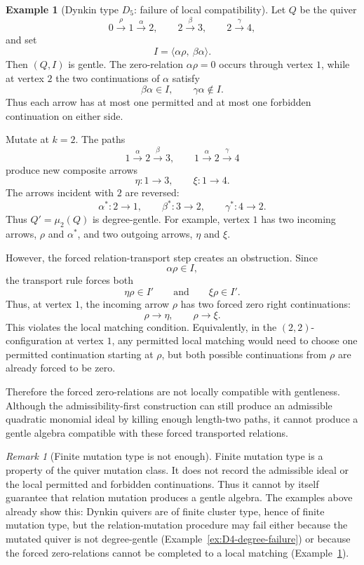 \documentclass[11pt]{article}
\theoremstyle{plain}
\theoremstyle{definition}
\newtheorem{example}[theorem]{Example}
\theoremstyle{remark}
\newtheorem{remark}[theorem]{Remark}
\begin{document}
\begin{example}[Dynkin type \(D_5\): failure of local compatibility]
\label{ex:D5-local-failure}
Let \(Q\) be the quiver
\[
  0\xrightarrow{\rho}1\xrightarrow{\alpha}2,
  \qquad
  2\xrightarrow{\beta}3,
  \qquad
  2\xrightarrow{\gamma}4,
\]
and set
\[
  I=\langle \alpha\rho,\ \beta\alpha\rangle.
\]
Then \((Q,I)\) is gentle.  The zero-relation \(\alpha\rho=0\) occurs through
vertex \(1\), while at vertex \(2\) the two continuations of \(\alpha\) satisfy
\[
  \beta\alpha\in I,
  \qquad
  \gamma\alpha\notin I.
\]
Thus each arrow has at most one permitted and at most one forbidden
continuation on either side.

Mutate at \(k=2\).  The paths
\[
  1\xrightarrow{\alpha}2\xrightarrow{\beta}3,
  \qquad
  1\xrightarrow{\alpha}2\xrightarrow{\gamma}4
\]
produce new composite arrows
\[
  \eta:1\to 3,
  \qquad
  \xi:1\to 4.
\]
The arrows incident with \(2\) are reversed:
\[
  \alpha^*:2\to 1,
  \qquad
  \beta^*:3\to 2,
  \qquad
  \gamma^*:4\to 2.
\]
Thus \(Q'=\mu_2(Q)\) is degree-gentle.  For example, vertex \(1\) has two
incoming arrows, \(\rho\) and \(\alpha^*\), and two outgoing arrows, \(\eta\)
and \(\xi\).

However, the forced relation-transport step creates an obstruction.  Since
\[
  \alpha\rho\in I,
\]
the transport rule forces both
\[
  \eta\rho\in I'
  \qquad\text{and}\qquad
  \xi\rho\in I'.
\]
Thus, at vertex \(1\), the incoming arrow \(\rho\) has two forced zero right
continuations:
\[
  \rho\longrightarrow \eta,
  \qquad
  \rho\longrightarrow \xi.
\]
This violates the local matching condition.  Equivalently, in the
\((2,2)\)-configuration at vertex \(1\), any permitted local matching would need
to choose one permitted continuation starting at \(\rho\), but both possible
continuations from \(\rho\) are already forced to be zero.

Therefore the forced zero-relations are not locally compatible with gentleness.
Although the admissibility-first construction can still produce an admissible
quadratic monomial ideal by killing enough length-two paths, it cannot produce
a gentle algebra compatible with these forced transported relations.
\end{example}

\begin{remark}[Finite mutation type is not enough]
\label{rem:finite-mutation-not-enough}
Finite mutation type is a property of the quiver mutation class.  It does not
record the admissible ideal or the local permitted and forbidden continuations.
Thus it cannot by itself guarantee that relation mutation produces a gentle
algebra.  The examples above already show this: Dynkin quivers are of finite
cluster type, hence of finite mutation type, but the relation-mutation procedure
may fail either because the mutated quiver is not degree-gentle
(Example~\ref{ex:D4-degree-failure}) or because the forced zero-relations cannot
be completed to a local matching (Example~\ref{ex:D5-local-failure}).
\end{remark}
\end{document}
